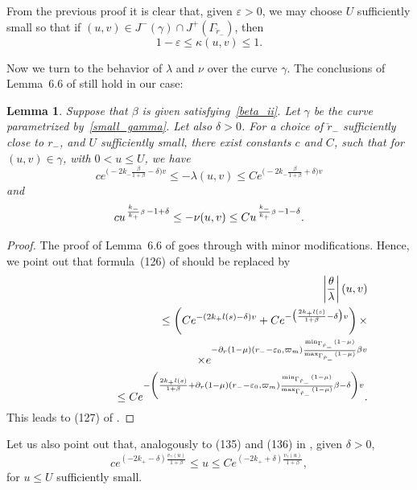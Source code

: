\documentclass[a4paper,11pt,oneside,reqno]{amsart}
\newcommand{\kk}{k_+}
\newcommand{\kkk}{k_-}
\newtheorem{Lem}[Thm]{Lemma}
\newcommand{\eps}{\varepsilon}
\newcommand{\ckrm}{\check r_-}
\newcommand{\cg}{\Gamma}
\newcommand{\gam}{\gamma}
\begin{document}
From the previous proof it is clear that,
given $\eps>0$, we may choose $U$ sufficiently small so that
if $(u,v)\in J^-(\gamma)\cap J^+(\Gamma_{\ckrm})$, then
\begin{equation}\label{H} 
1-\eps \leq \kappa(u,v)\leq 1.
\end{equation}

Now we turn to the behavior of $\lambda$ and $\nu$ over the curve $\gamma$.
The conclusions of Lemma~6.6 of \cite{relIst2} still hold in our case:
\begin{Lem}\label{lambda-and-nu}
Suppose that $\beta$ is given satisfying~\eqref{beta_ii}.
Let $\gam$ be the curve parametrized by~\eqref{small_gamma}.
Let also $\delta>0$. For a choice of $\ckrm$ sufficiently close to $r_-$, and $U$
sufficiently small,
there exist constants $c$ and $C$, such that
 for  $(u,v)\in\gam$, with $0<u\leq U$, we have
 \begin{equation} 
 ce^{\bigl(-2\kkk\frac\beta{1+\beta}-\delta\bigr)v}\leq -\lambda(u,v)\leq Ce^{\bigl(-2\kkk\frac\beta{1+\beta}+\delta\bigr)v}\label{lambda-above}
 \end{equation}
 and
  \begin{equation}
    cu^{\mbox{\tiny$\,\frac{\kkk}{\kk}\beta$}\,-1+\delta} \leq -\nu(u,v)\leq Cu^{\mbox{\tiny$\,\frac{\kkk}{\kk}\beta$}\,-1-\delta}.
  \label{nu-above}
  \end{equation}
\end{Lem}
\begin{proof}
The proof of Lemma~6.6 of \cite{relIst2}
goes through with minor modifications. Hence, we point out that formula~(126) of
\cite{relIst2} should be replaced by
\begin{eqnarray} 
\nonumber
&&\left|\frac\theta\lambda\right|(u,v)\\ \nonumber
&&
\ \leq \left(Ce^{-(2\kk l(s)-\delta) v}+
Ce^{-\bigl(\frac{2\kk l(s)}{1+\beta}-\delta\bigr) v}\right)\times
\\
\nonumber
&&\qquad\qquad\qquad\qquad\qquad\qquad\times
e^{-\partial_r(1-\mu)(r_--\eps_0,\varpi_m)\mbox{\tiny$\frac{\min_{\cg_{\ckrm}}(1-\mu)}{\max_{\cg_{\ckrm}}(1-\mu)}$}\beta v}\\
&&\ \leq Ce^{-\left(\frac{2\kk l(s)}{1+\beta}+
\partial_r(1-\mu)(r_--\eps_0,\varpi_m)\mbox{\tiny$\frac{\min_{\cg_{\ckrm}}(1-\mu)}{\max_{\cg_{\ckrm}}(1-\mu)}$}\beta-\delta\right)v}.\label{thetaLambdaGamma}
\end{eqnarray}
This leads to (127) of \cite{relIst2}.
\end{proof}
Let us also point out that, analogously to (135) and (136) in \cite{relIst2}, given $\delta>0$,
\begin{equation} 
ce^{(-2\kk-\delta)\frac{v_\gamma(u)}{1+\beta}}\label{O_ii} \leq u \leq Ce^{(-2\kk+\delta)\frac{v_\gamma(u)}{1+\beta}},
\end{equation}
for $u\leq U$ sufficiently small.
\end{document}
